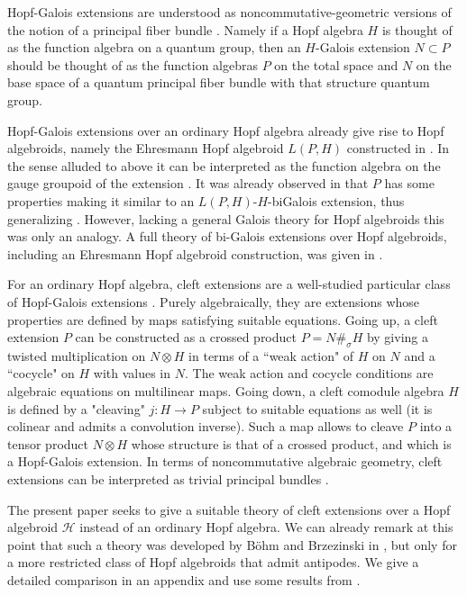 \documentclass[a4paper,reqno]{amsart}
\numberwithin{equation}{section}
\theoremstyle{plain}
\theoremstyle{remark}
\numberwithin{equation}{section}
\newcommand{\ot}{\otimes}
\newcommand{\CH}{\mathcal{H}}
\begin{document}
Hopf-Galois extensions are understood as noncommutative-geometric versions of the notion of a principal fiber bundle \cite{schneider}. Namely if a Hopf algebra $H$ is thought of as the function algebra on a quantum group, then an $H$-Galois extension  $N\subset P$ should be thought of as the function algebras $P$ on the total space and $N$ on the base space of a quantum principal fiber bundle with that structure quantum group.

Hopf-Galois extensions over an ordinary Hopf algebra already give rise to Hopf algebroids, namely the Ehresmann Hopf algebroid $L(P,H)$ constructed in \cite{schau4}. In the sense alluded to above it can be interpreted as the function algebra on the gauge groupoid of the extension \cite{HL20}. It was already observed in \cite{schau4} that $P$ has some properties making it similar to an $L(P,H)$-$H$-biGalois extension, thus generalizing \cite{schau5}. However, lacking a general Galois theory for Hopf algebroids this was only an analogy. A full theory of bi-Galois extensions over Hopf algebroids, including an Ehresmann Hopf algebroid construction, was given in \cite{HS25}.

For an ordinary Hopf algebra, cleft extensions are a well-studied particular class of Hopf-Galois extensions \cite{BM,DT, mont, schau7}. Purely algebraically, they are extensions whose properties are defined by maps satisfying suitable equations. Going up, a cleft extension $P$ can be constructed as a crossed product $P=N\#_\sigma H$ by giving a twisted multiplication on $N\ot H$ in terms of a ``weak action" of $H$ on $N$ and a ``cocycle" on $H$ with values in $N$. The weak action and cocycle conditions are algebraic equations on multilinear maps. Going down, a cleft comodule algebra $H$ is defined by a "cleaving" $j\colon H\to P$ subject to suitable equations as well (it is colinear and admits a convolution inverse). Such a map allows to cleave $P$ into a tensor product $N\ot H$ whose structure is that of a crossed product, and which is a Hopf-Galois extension. In terms of noncommutative algebraic geometry, cleft extensions can be interpreted as trivial principal bundles \cite{AFL,BHMS,HRZ,HKMZ,Pflaum}.

The present paper seeks to give a suitable theory of cleft extensions over a Hopf algebroid $\CH$ instead of an ordinary Hopf algebra. We can already remark at this point that such a theory was developed by Böhm and Brzezinski in \cite{BB}, but only for a more restricted class of Hopf algebroids that admit antipodes. We give a detailed comparison in an appendix and use some results from \cite{BB}.
\end{document}

